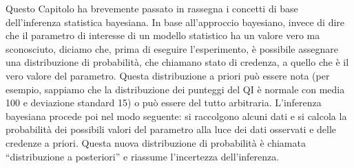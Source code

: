 \documentclass[
]{book}
\theoremstyle{definition}
\theoremstyle{definition}
\theoremstyle{definition}
\theoremstyle{definition}
\theoremstyle{remark}
\begin{document}
Questo Capitolo ha brevemente passato in rassegna i concetti di base dell'inferenza statistica bayesiana. In base all'approccio bayesiano, invece di dire che il parametro di interesse di un modello statistico ha un valore vero ma sconosciuto, diciamo che, prima di eseguire l'esperimento, è possibile assegnare una distribuzione di probabilità, che chiamano stato di credenza, a quello che è il vero valore del parametro. Questa distribuzione a priori può essere nota (per esempio, sappiamo che la distribuzione dei punteggi del QI è normale con media 100 e deviazione standard 15) o può essere del tutto arbitraria. L'inferenza bayesiana procede poi nel modo seguente: si raccolgono alcuni dati e si calcola la probabilità dei possibili valori del parametro alla luce dei dati osservati e delle credenze a priori. Questa nuova distribuzione di probabilità è chiamata ``distribuzione a posteriori'' e riassume l'incertezza dell'inferenza.

  
\end{document}
